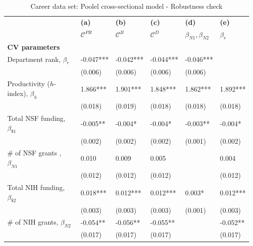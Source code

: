 \documentclass[10pt]{article}          %
\begin{document}
\begin{table}[H]
\caption{Career data set: Poolel cross-sectional model - Robustness check}
\begin{tabular}{m{5cm} p{2.1cm} p{2.1cm} p{2.1cm} p{2.1cm} p{2.1cm} }
\\
\hline
\hline
& \textbf{(a)} & \textbf{(b)} & \textbf{(c)} & \textbf{(d)} & \textbf{(e)} \\
& {$\mathscr{C}^{PR}$} & {$\mathscr{C}^{B}$} & {$\mathscr{C}^{D}$} & \sout{$\beta_{N1}, \beta_{N2}$} & \sout{$\beta_{r}$} \\ \hline

\multicolumn{6}{l}{\textbf{CV parameters}} \\
\rowcolor{lightgray}
{Department rank, $\beta_r$}          & -0.047*** & -0.042*** & -0.044*** & -0.046*** &           \\
                                      & (0.006)   & (0.006)   & (0.006)   & (0.006)   &           \\
\rowcolor{lightgray}                               
{Productivity ($h$-index), $\beta_h$} & 1.866***  & 1.901***  & 1.848***  & 1.862***  & 1.892***  \\
                                      & (0.018)   & (0.019)   & (0.018)   & (0.018)   & (0.018)   \\
\rowcolor{lightgray}
{Total NSF funding, $\beta_{\$1}$}    & -0.005**  & -0.004*   & -0.004*   & -0.003**  & -0.004*   \\
                                      & (0.002)   & (0.002)   & (0.002)   & (0.001)   & (0.002)   \\
\rowcolor{lightgray}
{\# of NSF grants , $\beta_{N1}$}     & 0.010     & 0.009     & 0.005     &           & 0.004     \\
                                      & (0.012)   & (0.012)   & (0.012)   &           & (0.012)   \\
\rowcolor{lightgray}
{Total NIH funding, $\beta_{\$2}$}    & 0.018***  & 0.012***  & 0.012***  & 0.003*    & 0.012***  \\
                                      & (0.003)   & (0.003)   & (0.003)   & (0.001)   & (0.003)   \\
\rowcolor{lightgray}
{\# of NIH grants, $\beta_{N2}$}      & -0.054**  & -0.056**  & -0.055**  &           & -0.052**  \\
                                      & (0.017)   & (0.017)   & (0.017)   &           & (0.017)   \\ \hline


\end{tabular}
\end{table}
\end{document}
